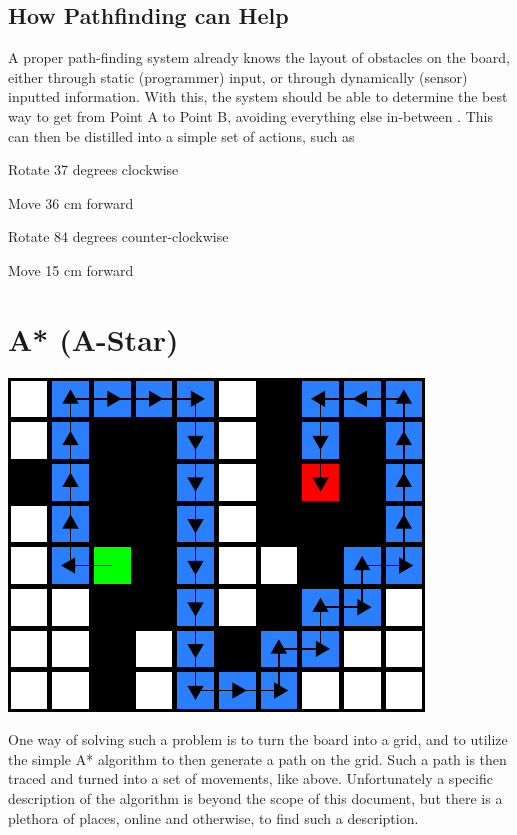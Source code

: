 \documentclass[letterpaper, 12pt]{article}
\begin{document}
\begin{multicols}{2}
\subsection{How Pathfinding can Help}

A proper path-finding system already knows the layout of obstacles on the board,
either through static (programmer) input, or through dynamically (sensor)
inputted information. With this, the system should be able to determine the best
way to get from Point A to Point B, avoiding everything else
in-between \cite{wikipathfinding}. This can then be distilled into a simple set
of actions, such as

\begin{enumerate*}
    \item Rotate 37 degrees clockwise
    \item Move 36 cm forward
    \item Rotate 84 degrees counter-clockwise
    \item Move 15 cm forward
\end{enumerate*}

\section{A* (A-Star)}

\includegraphics[width=\columnwidth]{img/a_star.pdf}

One way of solving such a problem is to turn the board into a grid, and to
utilize the simple A* algorithm to then generate a path on the grid. Such a path
is then traced and turned into a set of movements, like above. Unfortunately a
specific description of the algorithm is beyond the scope of this document, but
there is a plethora of places, online and otherwise, to find such a description.
\cite{wikiastar}


\end{multicols}
\end{document}
